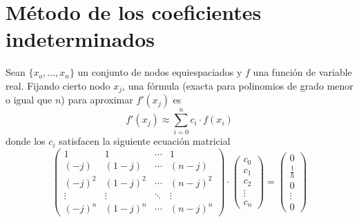             \section{Método de los coeficientes indeterminados}
            \begin{prop}
            Sean $\{x_o,\ldots,x_n\}$ un conjunto de nodos equiespaciados y $f$ una función de variable real. Fijando cierto nodo $x_j$, una fórmula (exacta para polinomios de grado menor o igual que $n$) para aproximar $f'(x_j)$ es
            $$f'(x_j)\approx\sum_{i=0}^n c_i\cdot f(x_i)$$
            donde los $c_i$ satisfacen la siguiente ecuación matricial
            $$\begin{pmatrix}
            1 & 1 &\cdots& 1\\
            (-j) & (1-j)&\cdots &(n-j)\\
            (-j)^2 & (1-j)^{2}&\cdots &(n-j)^2\\
            \vdots&\vdots&\ddots&\vdots\\
            (-j)^n &(1-j)^n&\cdots &(n-j)^n 
            \end{pmatrix} \cdot 
            \begin{pmatrix}
            c_0\\
            c_1\\
            c_2\\
            \vdots\\
            c_n
            \end{pmatrix}
            =\begin{pmatrix}
            0\\
            \frac{1}{h}\\
            0\\
            \vdots\\
            0
            \end{pmatrix}
            $$
            \end{prop}

